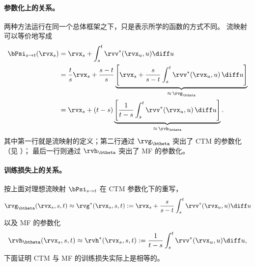 \paragraph{参数化上的关系。}
两种方法运行在同一个总体框架之下，只是表示所学的函数的方式不同。
流映射可以等价地写成
\begin{align*}
\bPsi_{s\to t}(\rvx_s)
& = \rvx_s + \int_s^t \rvv^*(\rvx_u, u)\diff u \\
&= \frac{t}{s}\rvx_s
   + \frac{s-t}{s}\underbrace{\Bigg[\rvx_s + \frac{s}{s-t}\int_s^t \rvv^*(\rvx_u,u)\,\diff u\Bigg]}_{\approx\,\rvg_\btheta} \\
&= \rvx_s + (t-s)\underbrace{\Bigg[\frac{1}{t-s}\int_s^t \rvv^*(\rvx_u,u)\,\diff u\Bigg]}_{\approx\,\rvh_\btheta}.
\end{align*}
其中第一行就是流映射的定义；第二行通过 $\rvg_\btheta$ 突出了 CTM 的参数化（见 ）；
最后一行则通过 $\rvh_\btheta$ 突出了 MF 的参数化。


\paragraph{训练损失上的关系。}按上面对理想流映射 $\bPsi_{s\to t}$ 在 CTM 参数化下的重写，
\[
\rvg_\btheta(\rvx_s,s,t) \approx \rvg^*(\rvx_s,s,t):=\rvx_s + \frac{s}{s-t}\int_s^t \rvv^*(\rvx_u,u) \diff u
\]
以及 MF 的参数化
\[
\rvh_\btheta(\rvx_s,s,t) \approx \rvh^*(\rvx_s,s,t):=\frac{1}{t-s}\int_s^t \rvv^*(\rvx_u,u) \diff u,
\]
下面证明 CTM 与 MF 的训练损失实际上是相等的。


